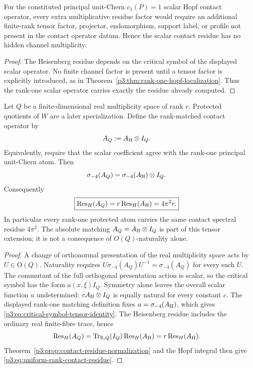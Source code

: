 \documentclass[12pt,a4paper]{article}
\begin{document}
\begin{lemma}
\label{p3:lem:no-hidden-hopf-channel}
For the constituted principal unit-Chern \(c_1(P)=1\) scalar Hopf contact operator, every extra
multiplicative residue factor would require an additional finite-rank tensor
factor, projector, endomorphism, support label, or profile not present in the
contact operator datum.  Hence the scalar contact residue has no hidden
channel multiplicity.
\end{lemma}

\begin{proof}
The Heisenberg residue depends on the critical symbol of the displayed scalar
operator.  No finite channel factor is present until a tensor factor is
explicitly introduced, as in Theorem~\ref{p3:thm:rank-one-hopf-localization}.
Thus the rank-one scalar operator carries exactly the residue already computed.
\end{proof}

\begin{theorem}
\label{p3:thm:rank-one-hopf-localization}
Let \(Q\) be a finite-dimensional real multiplicity space of rank \(r\).
Protected quotients of \(W\) are a later specialization.  Define the rank-matched contact operator
by
\[
 A_Q:=A_{\rm H}\otimes I_Q.
\]
Equivalently, require that the scalar coefficient agree with the rank-one
principal unit-Chern atom.  Then
\begin{equation}
\label{p3:eq:critical-symbol-tensor-identity}
 \sigma_{-4}(A_Q)
 =\sigma_{-4}(A_{\rm H})\otimes I_Q.
\end{equation}
Consequently
\begin{equation}
\label{p3:eq:uniform-rank-contact-residue}
 \boxed{
 \operatorname{Res}_{H}(A_Q)
 =r\operatorname{Res}_{H}(A_{\rm H})
 =4\pi^2 r.}
\end{equation}
In particular every rank-one protected atom carries the same contact
spectral residue \(4\pi^2\).  The absolute matching
\(A_Q=A_{\rm H}\otimes I_Q\) is part of this tensor extension; it is not a
consequence of \(O(Q)\)-naturality alone.
\end{theorem}

\begin{proof}
A change of orthonormal presentation of the real multiplicity space acts by
\(U\in\mathrm O(Q)\).  Naturality requires
\(U\sigma_{-4}(A_Q)U^{-1}=\sigma_{-4}(A_Q)\) for every such \(U\).  The
commutant of the full orthogonal presentation action is scalar, so the critical
symbol has the form \(a(x,\xi)I_Q\).  Symmetry alone leaves the overall scalar
function \(a\) undetermined: \(cA_{\rm H}\otimes I_Q\) is equally natural for
every constant \(c\).  The displayed rank-one matching definition fixes
\(a=\sigma_{-4}(A_{\rm H})\), which gives
\eqref{p3:eq:critical-symbol-tensor-identity}.  The Heisenberg residue includes the ordinary real finite-fibre trace, hence
\[
 \operatorname{Res}_{H}(A_Q)
 =\operatorname{Tr}_{\mathbb R,Q}(I_Q)\operatorname{Res}_{H}(A_{\rm H})
 =r\operatorname{Res}_{H}(A_{\rm H}).
\]
Theorem~\ref{p3:prop:contact-residue-normalization} and the Hopf integral then
give \eqref{p3:eq:uniform-rank-contact-residue}.
\end{proof}
\end{document}
